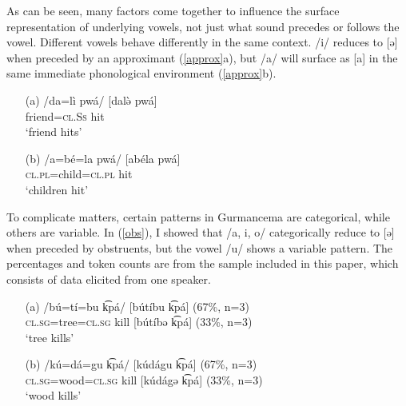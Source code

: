 \documentclass[output=paper,
modfonts
]{langscibook}
\begin{document}
As can be seen, many factors come together to influence the surface representation of underlying vowels, not just what sound precedes or follows the vowel. Different vowels behave differently in the same context. /i/ reduces to [ə] when preceded by an approximant (\ref{approx}a), but /a/ will surface as [a] in the same immediate phonological environment (\ref{approx}b). 

\ea \label{approx}
\begin{enumerate}
\item[(a)]
\gll /da=lì pwá/ \hspace{0.8cm} [dalə̀ pwá]\\
friend=\textsc{cl.Ss} hit\\
\glt `friend hits'

\item[(b)]
\gll /a=bé=la pwá/ \hspace{0.5cm} [abéla pwá]\\
\textsc{cl.pl}=child=\textsc{cl.pl} hit\\
\glt `children hit'

\end{enumerate}
\z

To complicate matters, certain patterns in Gurmancema are categorical, while others are variable. In (\ref{obs}), I showed that /a, i, o/ categorically reduce to [ə] when preceded by obstruents, but the vowel /u/ shows a variable pattern. The percentages and token counts are from the sample included in this paper, which consists of data elicited from one speaker. 

\ea \label{u}
\begin{enumerate}
\item[(a)]
\gll /bú=tí=bu k͡pá/  \hspace{0.6cm} [bútíbu k͡pá] (67\%, n=3) \\
 \textsc{cl.sg}=tree=\textsc{cl.sg} kill \hspace{0.5cm} [bútíbə k͡pá] (33\%, n=3)\\ 
\glt `tree kills'

\item[(b)]
\gll /kú=dá=gu k͡pá/  \hspace{0.5cm} [kúdágu k͡pá] (67\%, n=3) \\
 \textsc{cl.sg}=wood=\textsc{cl.sg} kill \hspace{0.5cm} [kúdágə k͡pá] (33\%, n=3)\\ 
\glt `wood kills'

\end{enumerate}
\z
\end{document}
